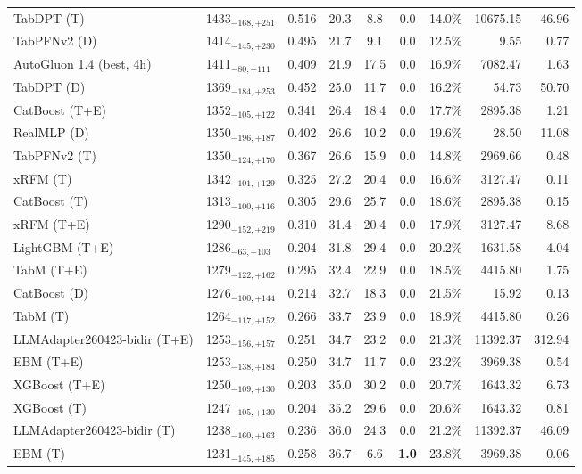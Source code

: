 \begin{tabular}{llcccccrr}
TabDPT (T) & 1433${}_{-168,+251}$ & 0.516 & 20.3 & 8.8 & 0.0 & 14.0\% & 10675.15 & 46.96 \\
TabPFNv2 (D) & 1414${}_{-145,+230}$ & 0.495 & 21.7 & 9.1 & 0.0 & 12.5\% & 9.55 & 0.77 \\
AutoGluon 1.4 (best, 4h) & 1411${}_{-80,+111}$ & 0.409 & 21.9 & 17.5 & 0.0 & 16.9\% & 7082.47 & 1.63 \\
TabDPT (D) & 1369${}_{-184,+253}$ & 0.452 & 25.0 & 11.7 & 0.0 & 16.2\% & 54.73 & 50.70 \\
CatBoost (T+E) & 1352${}_{-105,+122}$ & 0.341 & 26.4 & 18.4 & 0.0 & 17.7\% & 2895.38 & 1.21 \\
RealMLP (D) & 1350${}_{-196,+187}$ & 0.402 & 26.6 & 10.2 & 0.0 & 19.6\% & 28.50 & 11.08 \\
TabPFNv2 (T) & 1350${}_{-124,+170}$ & 0.367 & 26.6 & 15.9 & 0.0 & 14.8\% & 2969.66 & 0.48 \\
xRFM (T) & 1342${}_{-101,+129}$ & 0.325 & 27.2 & 20.4 & 0.0 & 16.6\% & 3127.47 & 0.11 \\
CatBoost (T) & 1313${}_{-100,+116}$ & 0.305 & 29.6 & 25.7 & 0.0 & 18.6\% & 2895.38 & 0.15 \\
xRFM (T+E) & 1290${}_{-152,+219}$ & 0.310 & 31.4 & 20.4 & 0.0 & 17.9\% & 3127.47 & 8.68 \\
LightGBM (T+E) & 1286${}_{-63,+103}$ & 0.204 & 31.8 & 29.4 & 0.0 & 20.2\% & 1631.58 & 4.04 \\
TabM (T+E) & 1279${}_{-122,+162}$ & 0.295 & 32.4 & 22.9 & 0.0 & 18.5\% & 4415.80 & 1.75 \\
CatBoost (D) & 1276${}_{-100,+144}$ & 0.214 & 32.7 & 18.3 & 0.0 & 21.5\% & 15.92 & 0.13 \\
TabM (T) & 1264${}_{-117,+152}$ & 0.266 & 33.7 & 23.9 & 0.0 & 18.9\% & 4415.80 & 0.26 \\
LLMAdapter260423-bidir (T+E) & 1253${}_{-156,+157}$ & 0.251 & 34.7 & 23.2 & 0.0 & 21.3\% & 11392.37 & 312.94 \\
EBM (T+E) & 1253${}_{-138,+184}$ & 0.250 & 34.7 & 11.7 & 0.0 & 23.2\% & 3969.38 & 0.54 \\
XGBoost (T+E) & 1250${}_{-109,+130}$ & 0.203 & 35.0 & 30.2 & 0.0 & 20.7\% & 1643.32 & 6.73 \\
XGBoost (T) & 1247${}_{-105,+130}$ & 0.204 & 35.2 & 29.6 & 0.0 & 20.6\% & 1643.32 & 0.81 \\
LLMAdapter260423-bidir (T) & 1238${}_{-160,+163}$ & 0.236 & 36.0 & 24.3 & 0.0 & 21.2\% & 11392.37 & 46.09 \\
EBM (T) & 1231${}_{-145,+185}$ & 0.258 & 36.7 & 6.6 & \textcolor{bronze}{\textbf{1.0}} & 23.8\% & 3969.38 & 0.06 \\

\end{tabular}
